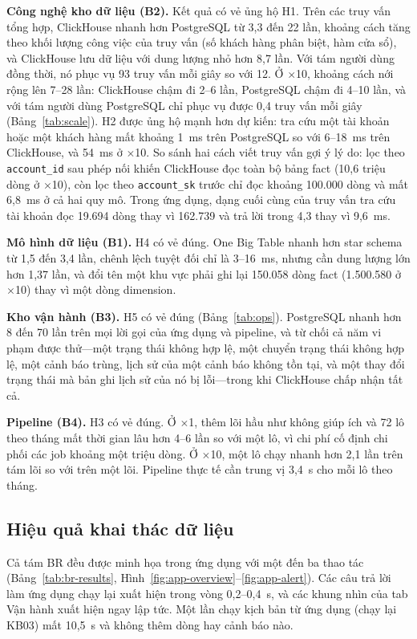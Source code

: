 \documentclass[peerreview]{IEEEtran}
\newcommand{\tbl}[1]{\texttt{#1}}
\begin{document}
\textbf{Công nghệ kho dữ liệu (B2).} Kết quả có vẻ ủng hộ H1. Trên các truy vấn tổng hợp,
ClickHouse nhanh hơn PostgreSQL từ 3,3 đến 22 lần, khoảng cách tăng theo khối lượng công việc
của truy vấn (số khách hàng phân biệt, hàm cửa sổ), và ClickHouse lưu dữ liệu với dung lượng
nhỏ hơn 8,7 lần. Với tám người dùng đồng thời, nó phục vụ 93 truy vấn mỗi giây so với 12. Ở
$\times$10, khoảng cách nới rộng lên 7--28 lần: ClickHouse chậm đi 2--6 lần, PostgreSQL chậm
đi 4--10 lần, và với tám người dùng PostgreSQL chỉ phục vụ được 0,4 truy vấn mỗi giây
(Bảng~\ref{tab:scale}). H2 được ủng hộ mạnh hơn dự kiến: tra cứu một tài khoản hoặc một khách
hàng mất khoảng 1~ms trên PostgreSQL so với 6--18~ms trên ClickHouse, và 54~ms ở $\times$10.
So sánh hai cách viết truy vấn gợi ý lý do: lọc theo \tbl{account\_id} sau phép nối khiến
ClickHouse đọc toàn bộ bảng fact (10,6 triệu dòng ở $\times$10), còn lọc theo
\tbl{account\_sk} trước chỉ đọc khoảng 100.000 dòng và mất 6,8~ms ở cả hai quy mô. Trong ứng
dụng, dạng cuối cùng của truy vấn tra cứu tài khoản đọc 19.694 dòng thay vì 162.739 và trả
lời trong 4,3 thay vì 9,6~ms.

\textbf{Mô hình dữ liệu (B1).} H4 có vẻ đúng. One Big Table nhanh hơn star schema từ 1,5 đến
3,4 lần, chênh lệch tuyệt đối chỉ là 3--16~ms, nhưng cần dung lượng lớn hơn 1,37 lần, và đổi
tên một khu vực phải ghi lại 150.058 dòng fact (1.500.580 ở $\times$10) thay vì một dòng
dimension.

\textbf{Kho vận hành (B3).} H5 có vẻ đúng (Bảng~\ref{tab:ops}). PostgreSQL nhanh hơn 8 đến
70 lần trên mọi lời gọi của ứng dụng và pipeline, và từ chối cả năm vi phạm được thử---một
trạng thái không hợp lệ, một chuyển trạng thái không hợp lệ, một cảnh báo trùng, lịch sử của
một cảnh báo không tồn tại, và một thay đổi trạng thái mà bản ghi lịch sử của nó bị lỗi---trong
khi ClickHouse chấp nhận tất cả.

\textbf{Pipeline (B4).} H3 có vẻ đúng. Ở $\times$1, thêm lõi hầu như không giúp ích và 72 lô
theo tháng mất thời gian lâu hơn 4--6 lần so với một lô, vì chi phí cố định chi phối các job
khoảng một triệu dòng. Ở $\times$10, một lô chạy nhanh hơn 2,1 lần trên tám lõi so với trên
một lõi. Pipeline thực tế cần trung vị 3,4~s cho mỗi lô theo tháng.

\subsection{Hiệu quả khai thác dữ liệu}
Cả tám BR đều được minh họa trong ứng dụng với một đến ba thao tác
(Bảng~\ref{tab:br-results}, Hình~\ref{fig:app-overview}--\ref{fig:app-alert}). Các câu trả
lời làm ứng dụng chạy lại xuất hiện trong vòng 0,2--0,4~s, và các khung nhìn của tab Vận hành
xuất hiện ngay lập tức. Một lần chạy kịch bản từ ứng dụng (chạy lại KB03) mất 10,5~s và không
thêm dòng hay cảnh báo nào.
\end{document}
